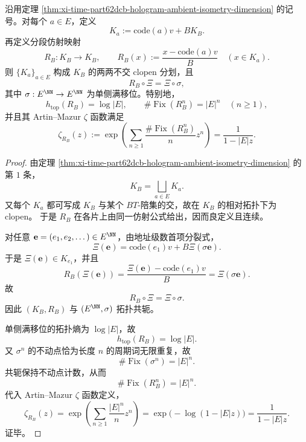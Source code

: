 \begin{theorem}\label{thm:xi-time-part62dcb-hologram-piecewise-affine-zeta}
沿用定理 \ref{thm:xi-time-part62dcb-hologram-ambient-isometry-dimension} 的记号。对每个
\(a\in E\)，定义
\[
K_a:=\mathrm{code}(a)v+B K_B.
\]
再定义分段仿射映射
\[
R_B:K_B\to K_B,
\qquad
R_B(x):=\frac{x-\mathrm{code}(a)v}{B}
\quad (x\in K_a).
\]
则 \(\{K_a\}_{a\in E}\) 构成 \(K_B\) 的两两不交 clopen 分划，且
\[
R_B\circ \Xi=\Xi\circ \sigma,
\]
其中 \(\sigma:E^{\NN}\to E^{\NN}\) 为单侧满移位。特别地，
\[
h_{\mathrm{top}}(R_B)=\log |E|,
\qquad
\#\operatorname{Fix}(R_B^n)=|E|^n
\quad (n\ge 1),
\]
并且其 Artin--Mazur \(\zeta\) 函数满足
\[
\zeta_{R_B}(z)
:=
\exp\!\left(\sum_{n\ge 1}\frac{\#\operatorname{Fix}(R_B^n)}{n}z^n\right)
=
\frac{1}{1-|E|z}.
\]
\end{theorem}
\begin{proof}
由定理 \ref{thm:xi-time-part62dcb-hologram-ambient-isometry-dimension} 的第 \(1\) 条，
\[
K_B=\bigsqcup_{a\in E}K_a.
\]
又每个 \(K_a\) 都可写成 \(K_B\) 与某个 \(BT\)-陪集的交，故在 \(K_B\) 的相对拓扑下为 clopen。
于是 \(R_B\) 在各片上由同一仿射公式给出，因而良定义且连续。

对任意 \(\mathbf e=(e_1,e_2,\dots)\in E^{\NN}\)，由地址级数首项分裂式，
\[
\Xi(\mathbf e)=\mathrm{code}(e_1)v+B\Xi(\sigma\mathbf e).
\]
于是 \(\Xi(\mathbf e)\in K_{e_1}\)，并且
\[
R_B(\Xi(\mathbf e))
=
\frac{\Xi(\mathbf e)-\mathrm{code}(e_1)v}{B}
=
\Xi(\sigma\mathbf e).
\]
故
\[
R_B\circ \Xi=\Xi\circ \sigma.
\]
因此 \((K_B,R_B)\) 与 \((E^{\NN},\sigma)\) 拓扑共轭。

单侧满移位的拓扑熵为 \(\log|E|\)，故
\[
h_{\mathrm{top}}(R_B)=\log|E|.
\]
又 \(\sigma^n\) 的不动点恰为长度 \(n\) 的周期词无限重复，故
\[
\#\operatorname{Fix}(\sigma^n)=|E|^n.
\]
共轭保持不动点计数，从而
\[
\#\operatorname{Fix}(R_B^n)=|E|^n.
\]
代入 Artin--Mazur \(\zeta\) 函数定义，
\[
\zeta_{R_B}(z)
=
\exp\!\left(\sum_{n\ge 1}\frac{|E|^n}{n}z^n\right)
=
\exp\!\bigl(-\log(1-|E|z)\bigr)
=
\frac{1}{1-|E|z}.
\]
证毕。
\end{proof}

